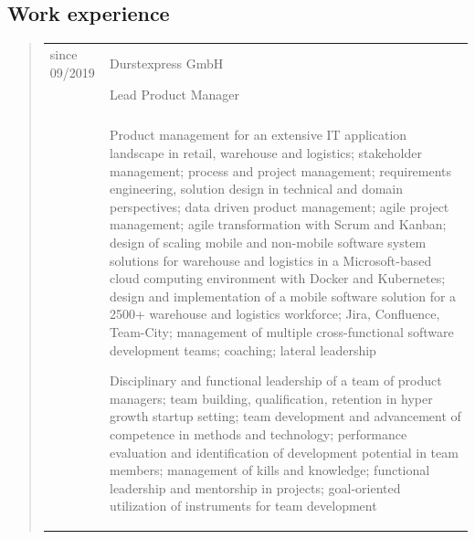 \subsection*{Work experience}
	\begin{quote}
		\begin{tabular}{p{4cm}l}
			since 09/2019&Durstexpress GmbH\\
			&Lead Product Manager\\
			\\
			&\begin{minipage}{10cm}
				Product management for an extensive IT application landscape in retail, warehouse and logistics; 
				stakeholder management; process and project management; requirements engineering, solution design in technical and domain perspectives;
				data driven product management; agile project management; agile transformation with Scrum and Kanban; design of scaling mobile and 				non-mobile software system solutions for warehouse and logistics in a Microsoft-based cloud computing environment with Docker and Kubernetes; 
				design and implementation of a mobile software solution for a 2500+ warehouse and logistics workforce; 
				Jira, Confluence, Team-City; management of multiple cross-functional software development teams; coaching; lateral leadership\newline
				
				Disciplinary and functional leadership of a team of product managers; team building, qualification, retention in hyper growth startup 				setting; team development and advancement of competence in methods and technology; performance evaluation and 
				identification of development potential in team members; management of kills and knowledge; functional 
				leadership and mentorship in projects; goal-oriented utilization of instruments for team development
			\end{minipage}
		\end{tabular}
	\end{quote}

